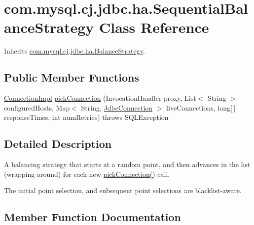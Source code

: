\hypertarget{classcom_1_1mysql_1_1cj_1_1jdbc_1_1ha_1_1_sequential_balance_strategy}{}\section{com.\+mysql.\+cj.\+jdbc.\+ha.\+Sequential\+Balance\+Strategy Class Reference}
\label{classcom_1_1mysql_1_1cj_1_1jdbc_1_1ha_1_1_sequential_balance_strategy}


Inherits \mbox{\hyperlink{interfacecom_1_1mysql_1_1cj_1_1jdbc_1_1ha_1_1_balance_strategy}{com.\+mysql.\+cj.\+jdbc.\+ha.\+Balance\+Strategy}}.

\subsection*{Public Member Functions}
\begin{DoxyCompactItemize}
\item 
\mbox{\hyperlink{classcom_1_1mysql_1_1cj_1_1jdbc_1_1_connection_impl}{Connection\+Impl}} \mbox{\hyperlink{classcom_1_1mysql_1_1cj_1_1jdbc_1_1ha_1_1_sequential_balance_strategy_a2fb26910a5b3161faa35e0264d5c7adc}{pick\+Connection}} (Invocation\+Handler proxy, List$<$ String $>$ configured\+Hosts, Map$<$ String, \mbox{\hyperlink{interfacecom_1_1mysql_1_1cj_1_1jdbc_1_1_jdbc_connection}{Jdbc\+Connection}} $>$ live\+Connections, long\mbox{[}$\,$\mbox{]} response\+Times, int num\+Retries)  throws S\+Q\+L\+Exception 
\end{DoxyCompactItemize}


\subsection{Detailed Description}
A balancing strategy that starts at a random point, and then advances in the list (wrapping around) for each new \mbox{\hyperlink{classcom_1_1mysql_1_1cj_1_1jdbc_1_1ha_1_1_sequential_balance_strategy_a2fb26910a5b3161faa35e0264d5c7adc}{pick\+Connection()}} call.

The initial point selection, and subsequent point selections are blacklist-\/aware. 

\subsection{Member Function Documentation}
\mbox{\label{classcom_1_1mysql_1_1cj_1_1jdbc_1_1ha_1_1_sequential_balance_strategy_a2fb26910a5b3161faa35e0264d5c7adc}} 
